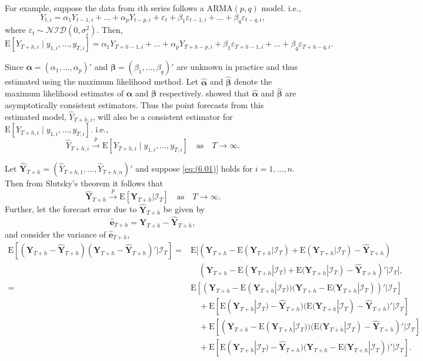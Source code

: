 \documentclass[a4paper, 11pt]{article}
\def\E{\text{E}}
\begin{document}
For example, suppose the data from $i$th series follows a ARMA$(p,q)$ model. i.e.,
$$
Y_{t,i}=\alpha_1Y_{t-1,i}+\dots+\alpha_pY_{t-p,i}+\varepsilon_t + \beta_1\varepsilon_{t-1,i}+\dots+\beta_q\varepsilon_{t-q,i},
$$
where $\varepsilon_t \sim \mathcal{NID}(0, \sigma_i^2)$. Then,
$$
\E[Y_{T+h,i}\mid y_{1,i},\dots,y_{T,i}] = \alpha_1Y_{T+h-1,i}+\dots+\alpha_pY_{T+h-p,i}+ \beta_1\varepsilon_{T+h-1,i}+\dots+\beta_q\varepsilon_{T+h-q,i}.
$$

Since $\bm{\alpha} = (\alpha_1,\dots,\alpha_p)'$ and $\bm{\beta} = (\beta_1,\dots,\beta_q)'$ are unknown in practice and thus estimated using the maximum likelihood method. Let $\bm{\hat{\alpha}}$ and $\bm{\hat{\beta}}$ denote the maximum likelihood estimates of $\bm{\alpha}$ and $\bm{\beta}$ respectively. \citet{Yao2006} showed that $\bm{\hat{\alpha}}$ and $\bm{\hat{\beta}}$ are asymptotically consistent estimators. Thus the point forecasts from this estimated model, $\hat{Y}_{T+h,i}$, will also be a consistent estimator for $\E[Y_{T+h,i}\mid y_{1,i},\dots,y_{T,i}]$. i.e.,
\begin{equation} \label{eq:(6.01)}
\hat{Y}_{T+h,i} \overset{p}{\to} \E[Y_{T+h,i}\mid y_{1,i},\dots,y_{T,i}] \quad \text{as} \quad T \to \infty.
\end{equation}

Let $\hat{\bm{Y}}_{T+h}=(\hat{Y}_{T+h,1},\dots,\hat{Y}_{T+h,n})'$ and suppose \eqref{eq:(6.01)} holds for $i=1,\dots,n$. Then from Slutsky's theorem it follows that
\begin{equation}\label{eq:(6.02)}
\hat{\bm{Y}}_{T+h} \overset{p}{\to} \E[\bm{Y}_{T+h}|\bm{\mathcal{I}}_T] \quad \text{as} \quad T \to \infty.
\end{equation}
Further, let the forecast error due to $\hat{\bm{Y}}_{T+h}$ be given by
\begin{equation}
\hat{\bm{e}}_{T+h} = \bm{Y}_{T+h}-\hat{\bm{Y}}_{T+h},
\end{equation}
and consider the variance of $\hat{\bm{e}}_{T+h}$,
\begin{align*}
\E[(\bm{Y}_{T+h} - \hat{\bm{Y}}_{T+h})(\bm{Y}_{T+h} - \hat{\bm{Y}}_{T+h})'|\bm{\mathcal{I}}_T] = &
\E[(\bm{Y}_{T+h} - \E(\bm{Y}_{T+h}|\bm{\mathcal{I}}_T) + \E(\bm{Y}_{T+h}|\bm{\mathcal{I}}_T)- \hat{\bm{Y}}_{T+h})\\
& \quad
(\bm{Y}_{T+h} - \E(\bm{Y}_{T+h}|\bm{\mathcal{I}}_T) + \E(\bm{Y}_{T+h}|\bm{\mathcal{I}}_T) - \hat{\bm{Y}}_{T+h})'|\bm{\mathcal{I}}_T],\\
= &
\E[(\bm{Y}_{T+h} - \E(\bm{Y}_{T+h}|\bm{\mathcal{I}}_T))(\bm{Y}_{T+h} - \E(\bm{Y}_{T+h}|\bm{\mathcal{I}}_T))'|\bm{\mathcal{I}}_T]\\
& \quad
+ \E[\E(\bm{Y}_{T+h}|\bm{\mathcal{I}}_T) - \hat{\bm{Y}}_{T+h})(\E(\bm{Y}_{T+h}|\bm{\mathcal{I}}_T) - \hat{\bm{Y}}_{T+h})'|\bm{\mathcal{I}}_T]\\
& \quad
+  \E[(\bm{Y}_{T+h} - \E(\bm{Y}_{T+h}|\bm{\mathcal{I}}_T))(\E(\bm{Y}_{T+h}|\bm{\mathcal{I}}_T) - \hat{\bm{Y}}_{T+h})'|\bm{\mathcal{I}}_T]\\
&  \quad
+ \E[\E(\bm{Y}_{T+h}|\bm{\mathcal{I}}_T) - \hat{\bm{Y}}_{T+h})(\bm{Y}_{T+h} - \E(\bm{Y}_{T+h}|\bm{\mathcal{I}}_T))'|\bm{\mathcal{I}}_T].
\end{align*}
\end{document}
